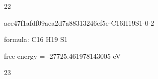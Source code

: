\documentclass{article}
\begin{document}
22

\vspace{1cm}


ace47f1afdf09aea2d7a88313246cf5e-C16H19S1-0-2



formula: C16 H19 S1



free energy = -27725.461978143005 eV

23
\end{document}
